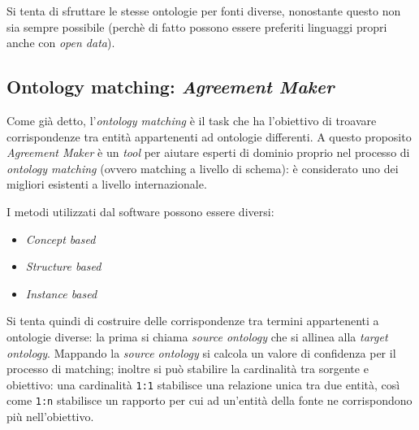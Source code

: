 \documentclass[11pt]{article}
\begin{document}
Si tenta di sfruttare le stesse ontologie per fonti diverse, nonostante questo non sia sempre possibile (perchè di fatto possono essere preferiti linguaggi propri anche con \textit{open data}).

\subsection{Ontology matching: \textit{Agreement Maker}}
Come già detto, l'\textit{ontology matching} è il task che ha l'obiettivo di troavare corrispondenze tra entità appartenenti ad ontologie differenti. A questo proposito \textit{Agreement Maker} è un \textit{tool} per aiutare esperti di dominio proprio nel processo di \textit{ontology matching} (ovvero matching a livello di schema): è considerato uno dei migliori esistenti a livello internazionale.

I metodi utilizzati dal software possono essere diversi:
\begin{itemize}
\item \textit{Concept based}
\item \textit{Structure based}
\item \textit{Instance based}
\end{itemize}
Si tenta quindi di costruire delle corrispondenze tra termini appartenenti a ontologie diverse: la prima si chiama \textit{source ontology} che si allinea alla \textit{target ontology}.
Mappando la \textit{source ontology} si calcola un valore di confidenza per il processo di matching; inoltre si può stabilire la cardinalità tra sorgente e obiettivo: una cardinalità \verb|1:1| stabilisce una relazione unica tra due entità, così come \verb|1:n| stabilisce un rapporto per cui ad un'entità della fonte ne corrispondono più nell'obiettivo.
\end{document}
